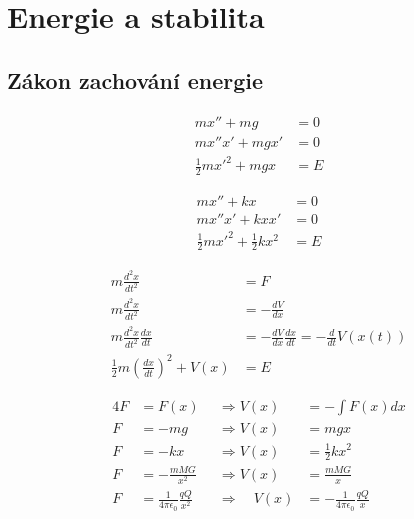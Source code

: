 \chapter{Energie a stabilita}

\section{Zákon zachování energie}

\begin{příklad}
\begin{align*}
mx''+mg &= 0 \\
mx''x'+mgx' &= 0 \\
\frac{1}{2}mx'^{2}+mgx &= E
\end{align*}
\end{příklad}

\begin{příklad}
\begin{align*}
	mx''+kx &= 0 \\
	mx''x'+kxx' &= 0 \\
	\frac{1}{2}mx'^2+\frac{1}{2}kx^{2} &= E 
\end{align*}
\end{příklad}

\begin{příklad}
\begin{align*}
	m \frac{d^{2}x}{dt^{2}} &= F \\
	m \frac{d^{2}x}{dt^{2}} &= -\frac{dV}{dx} \\
	m \frac{d^{2}x}{dt^{2}}\frac{dx}{dt} &= -\frac{dV}{dx}\frac{dx}{dt} = -\frac{d}{dt}V(x(t)) \\
	\frac{1}{2}m \left(\frac{dx}{dt}\right)^{2}+V(x)&=E
\end{align*}

\begin{alignat*}{4}
	F&=F(x) &\Rightarrow V(x)&=-\int F(x)dx \\
	F&=-mg &\Rightarrow V(x)&=mgx \\
	F&=-kx &\Rightarrow V(x)&=\frac{1}{2}kx^{2} \\
	F&=-\frac{mMG}{x^{2}} &\Rightarrow V(x) &= \frac{mMG}{x} \\
	F&=\frac{1}{4\pi\epsilon_0}\frac{qQ}{x^{2}}\quad &\Rightarrow\quad V(x)&=-\frac{1}{4\pi\epsilon_0}\frac{qQ}{x}
\end{alignat*}
\end{příklad}


